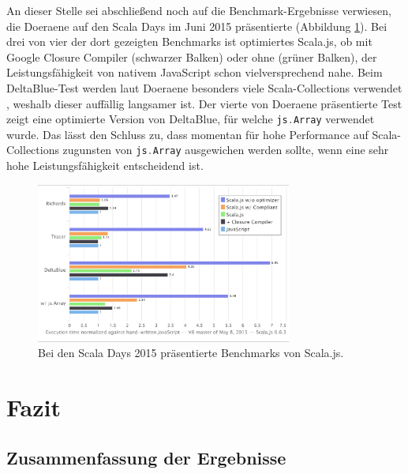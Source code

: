 \documentclass[a4paper, 12pt, hidelinks, listof=totoc, listoftables=totoc, bibliography=totoc]{scrreprt}
\newcommand{\code}[1]{\lstinline[language=Scala, style=inline]|#1|}
\begin{document}
An dieser Stelle sei abschließend noch auf die Benchmark-Ergebnisse verwiesen, die Doeraene auf den Scala Days im Juni 2015 präsentierte (Abbildung \ref{fig:doeraene-benchmarks}). Bei drei von vier der dort gezeigten Benchmarks ist optimiertes Scala.js, ob mit Google Closure Compiler (schwarzer Balken) oder ohne (grüner Balken), der Leistungsfähigkeit von nativem JavaScript schon vielversprechend nahe. Beim DeltaBlue-Test werden laut Doeraene besonders viele Scala-Collections verwendet \cite[Folie 52, Min. 40]{doeraene2015.SSP}, weshalb dieser auffällig langsamer ist. Der vierte von Doeraene präsentierte Test zeigt eine optimierte Version von DeltaBlue, für welche \code{js.Array} verwendet wurde. Das lässt den Schluss zu, dass momentan für hohe Performance auf Scala-Collections zugunsten von \code{js.Array} ausgewichen werden sollte, wenn eine sehr hohe Leistungsfähigkeit entscheidend ist.

\begin{figure}[!h]
    \centering
    \includegraphics[width=0.75\textwidth]{Doeraene2015-Scalajs-p52}
    \caption[Bei den Scala Days 2015 präsentierte Benchmarks von Scala.js.]{Bei den Scala Days 2015 präsentierte Benchmarks von Scala.js. \cite[Folie 52]{doeraene2015.SSP}}
    \label{fig:doeraene-benchmarks}
\end{figure}





\chapter{Fazit}\label{chap:conclusion}

\section{Zusammenfassung der Ergebnisse}
\end{document}

